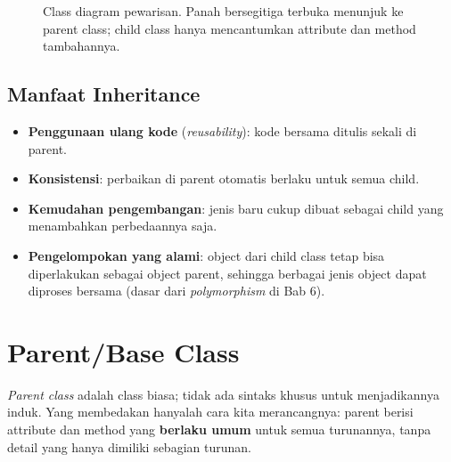 \begin{figure}[htbp]
\centering
{}
\caption{Class diagram pewarisan. Panah bersegitiga terbuka menunjuk ke parent class; child class hanya mencantumkan attribute dan method tambahannya.}
\end{figure}

\subsection{Manfaat Inheritance}

\begin{itemize}
  \item \textbf{Penggunaan ulang kode} (\emph{reusability}): kode bersama ditulis sekali di parent.
  \item \textbf{Konsistensi}: perbaikan di parent otomatis berlaku untuk semua child.
  \item \textbf{Kemudahan pengembangan}: jenis baru cukup dibuat sebagai child yang menambahkan perbedaannya saja.
  \item \textbf{Pengelompokan yang alami}: object dari child class tetap bisa diperlakukan sebagai object parent, sehingga berbagai jenis object dapat diproses bersama (dasar dari \emph{polymorphism} di Bab 6).
\end{itemize}

\section{Parent/Base Class}

\emph{Parent class} adalah class biasa; tidak ada sintaks khusus untuk menjadikannya induk. Yang membedakan hanyalah cara kita merancangnya: parent berisi attribute dan method yang \textbf{berlaku umum} untuk semua turunannya, tanpa detail yang hanya dimiliki sebagian turunan.

